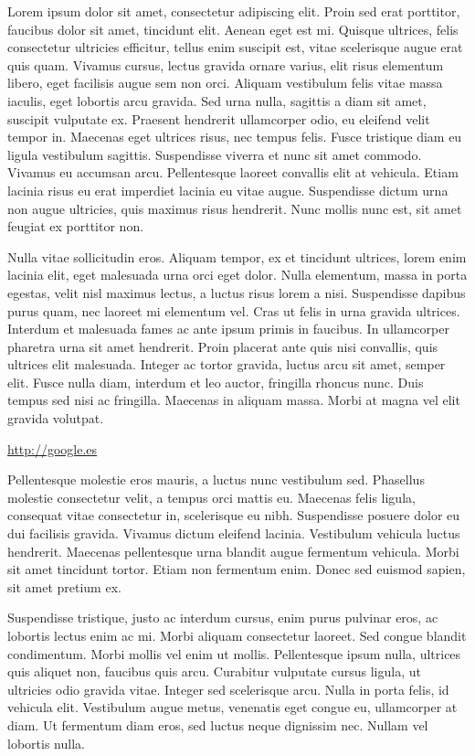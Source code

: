 

Lorem ipsum dolor sit amet, consectetur adipiscing elit. Proin sed erat porttitor, faucibus dolor sit amet, tincidunt elit. Aenean eget est mi. Quisque ultrices, felis consectetur ultricies efficitur, tellus enim suscipit est, vitae scelerisque augue erat quis quam. Vivamus cursus, lectus gravida ornare varius, elit risus elementum libero, eget facilisis augue sem non orci. Aliquam vestibulum felis vitae massa iaculis, eget lobortis arcu gravida. Sed urna nulla, sagittis a diam sit amet, suscipit vulputate ex. Praesent hendrerit ullamcorper odio, eu eleifend velit tempor in. Maecenas eget ultrices risus, nec tempus felis. Fusce tristique diam eu ligula vestibulum sagittis. Suspendisse viverra et nunc sit amet commodo. Vivamus eu accumsan arcu. Pellentesque laoreet convallis elit at vehicula. Etiam lacinia risus eu erat imperdiet lacinia eu vitae augue. Suspendisse dictum urna non augue ultricies, quis maximus risus hendrerit. Nunc mollis nunc est, sit amet feugiat ex porttitor non.


Nulla vitae sollicitudin eros. Aliquam tempor, ex et tincidunt ultrices, lorem enim lacinia elit, eget malesuada urna orci eget dolor. Nulla elementum, massa in porta egestas, velit nisl maximus lectus, a luctus risus lorem a nisi. Suspendisse dapibus purus quam, nec laoreet mi elementum vel. Cras ut felis in urna gravida ultrices. Interdum et malesuada fames ac ante ipsum primis in faucibus. In ullamcorper pharetra urna sit amet hendrerit. Proin placerat ante quis nisi convallis, quis ultrices elit malesuada. Integer ac tortor gravida, luctus arcu sit amet, semper elit. Fusce nulla diam, interdum et leo auctor, fringilla rhoncus nunc. Duis tempus sed nisi ac fringilla. Maecenas in aliquam massa. Morbi at magna vel elit gravida volutpat.

\url{http://google.es}

Pellentesque molestie eros mauris, a luctus nunc vestibulum sed. Phasellus molestie consectetur velit, a tempus orci mattis eu. Maecenas felis ligula, consequat vitae consectetur in, scelerisque eu nibh. Suspendisse posuere dolor eu dui facilisis gravida. Vivamus dictum eleifend lacinia. Vestibulum vehicula luctus hendrerit. Maecenas pellentesque urna blandit augue fermentum vehicula. Morbi sit amet tincidunt tortor. Etiam non fermentum enim. Donec sed euismod sapien, sit amet pretium ex.

Suspendisse tristique, justo ac interdum cursus, enim purus pulvinar eros, ac lobortis lectus enim ac mi. Morbi aliquam consectetur laoreet. Sed congue blandit condimentum. Morbi mollis vel enim ut mollis. Pellentesque ipsum nulla, ultrices quis aliquet non, faucibus quis arcu. Curabitur vulputate cursus ligula, ut ultricies odio gravida vitae. Integer sed scelerisque arcu. Nulla in porta felis, id vehicula elit. Vestibulum augue metus, venenatis eget congue eu, ullamcorper at diam. Ut fermentum diam eros, sed luctus neque dignissim nec. Nullam vel lobortis nulla.

